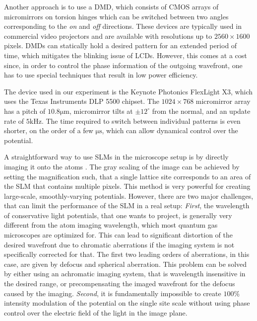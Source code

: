 Another approach is to use a DMD, which consists of CMOS arrays of micromirrors on torsion hinges which can be switched
between two angles corresponding to the \textit{on} and \textit{off} directions. These devices are typically used in commercial video projectors and are available with resolutions up to $2560 \times 1600$ pixels. DMDs can statically hold a desired pattern for an extended period of time, which mitigates the blinking issue of LCDs. However, this comes at a cost since, in order to control the phase information of the outgoing wavefront, one has to use special techniques\cite{Lee1970, Goorden2014} that result in low power efficiency. 

The device used in our experiment is the Keynote Photonics FlexLight X3, which uses the Texas Instruments DLP 5500 chipset. The $1024 \times 768$ micromirror array has a pitch of $10.8 \mathrm{\mu m}$, micromirror tilts at $\pm 12^{\circ}$ from the normal, and an update rate of $5 \mathrm{kHz}$. The time required to switch between individual patterns is even shorter, on the order of a few $\mathrm{\mu s}$, which can allow dynamical control over the potential.

A straightforward way to use SLMs in the microscope setup is by directly imaging it onto the atoms \cite{P. Schauß thesis, RMA thesis, MAZU thesis}. The gray scaling of the image can be achieved by setting the magnification such, that a single lattice site corresponds to an area of the SLM that contains multiple pixels. This method is very powerful for creating large-scale, smoothly-varying potentials. However, there are two major challenges, that can limit the performance of the SLM in a real setup: \textit{First}, the wavelength of conservative light potentials, that one wants to project, is generally very different from the atom imaging wavelength, which most quantum gas microscopes are optimized for. This can lead to significant distortion of the desired wavefront due to chromatic aberrations if the imaging system is not specifically corrected for that. The first two leading orders of aberrations, in this case, are given by defocus and spherical aberration. This problem can be solved by either using an achromatic imaging system, that is wavelength insensitive in the desired range, or precompensating the imaged wavefront for the defocus caused by the imaging. \textit{Second}, it is fundamentally impossible to create $100 \%$ intensity modulation of the potential on the single site scale without using phase control over the electric field of the light in the image plane. 

